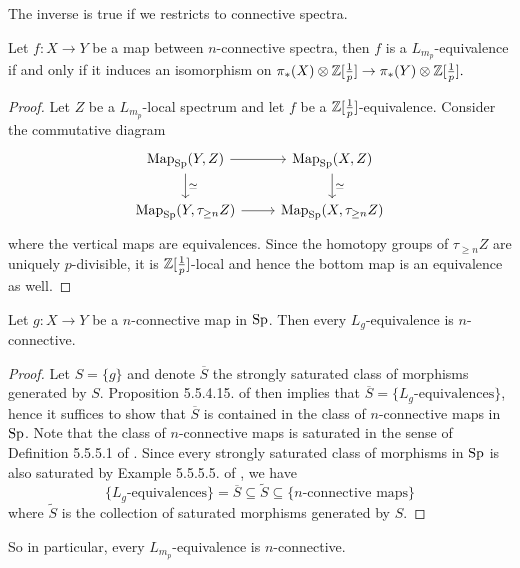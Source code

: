 The inverse is true if we restricts to connective spectra.
\begin{lemma}
\label{L-equivalence is equivalent to pi_* iso on n-conn spectra}
	Let $f:X\to Y$ be a map between $n$-connective spectra, then $f$ is a $L_{m_{p}}$-equivalence if and only if it induces an isomorphism on 
	$
	\pi_{*}(X)\otimes {\mathbb{Z}}[\frac{1}{p}]
	\to
	\pi_{*}(Y)\otimes {\mathbb{Z}}[\frac{1}{p}].
	$
\end{lemma}
\begin{proof}
	Let $Z$ be a $L_{m_p}$-local spectrum and let $f$ be a ${\mathbb{Z}}[\frac{1}{p}]$-equivalence. Consider the commutative diagram
	\[
	\begin{tikzcd}
		\map_{\Sp}(Y,Z) & \map_{\Sp}(X,Z)\\
		\map_{\Sp}(Y,\tau_{\geq n}Z) & \map_{\Sp}(X,\tau_{\geq n}Z)
		\arrow[from=1-1, to=1-2]
		\arrow[from=2-1, to=2-2]
		\arrow[from=1-1, to=2-1,"\simeq"]
		\arrow[from=1-2, to=2-2,"\simeq"]
	\end{tikzcd}
	\]
	where the vertical maps are equivalences. Since the homotopy groups of $\tau_{\geq n}Z$ are uniquely $p$-divisible, it is ${\mathbb{Z}}[\frac{1}{p}]$-local and hence the bottom map is an equivalence as well.
\end{proof}



\begin{proposition}
\label{connectivity of local equivalences}
	Let $g: X\to Y$ be a $n$-connective map in $\operatorname{Sp}$. Then every $L_g$-equivalence is $n$-connective.
\end{proposition}
\begin{proof}
	Let $S=\{g\}$ and denote $\overline{S}$ the strongly saturated class of morphisms generated by $S$. Proposition 5.5.4.15. of \cite{HTT} then implies that  $\overline{S}= \{L_g\text{-equivalences}\}$, hence it suffices to show that $\overline{S}$ is contained in the class of $n$-connective maps in $\operatorname{Sp}$. Note that the class of $n$-connective maps is saturated in the sense of Definition 5.5.5.1 of \cite{HTT}. Since every strongly saturated class of morphisms in $\operatorname{Sp}$ is also saturated by Example 5.5.5.5. of \cite{HTT}, we have
	$$
	\{L_g\text{-equivalences}\}=\overline{S} \subseteq \tilde{S} \subseteq \{n\text{-connective maps}\}
	$$
	where $\tilde{S}$ is the collection of saturated morphisms generated by $S$.
\end{proof}
\begin{remark}
	So in particular, every $L_{m_p}$-equivalence is $n$-connective.
\end{remark}


